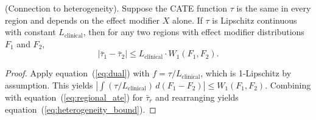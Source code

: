 \documentclass[AMA,Times1COL]{WileyNJDv5}
\begin{document}
\begin{proposition}\label{prop:heterogeneity}
\textup{(Connection to heterogeneity).} Suppose the CATE function $\tau$ is the same in every region and depends on the effect modifier $X$ alone. If $\tau$ is Lipschitz continuous with constant $L_{\text{clinical}}$, then for any two regions with effect modifier distributions $F_1$ and $F_2$,
\begin{equation}
|\bar{\tau}_1 - \bar{\tau}_2| \leq L_{\text{clinical}} \cdot W_1(F_1, F_2).
\label{eq:heterogeneity_bound}
\end{equation}
\end{proposition}

\begin{proof}
Apply equation~(\ref{eq:dual}) with $f = \tau / L_{\text{clinical}}$, which is 1-Lipschitz by assumption. This yields $\left|\int (\tau / L_{\text{clinical}}) \, d(F_1 - F_2)\right| \leq W_1(F_1, F_2)$. Combining with equation~(\ref{eq:regional_ate}) for $\bar{\tau}_r$ and rearranging yields equation~(\ref{eq:heterogeneity_bound}).
\end{proof}
\end{document}

